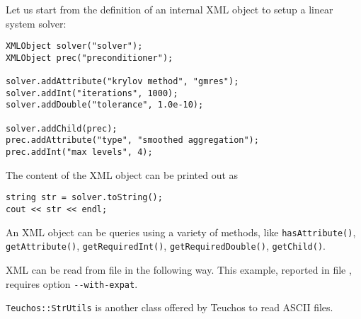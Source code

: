 Let us start from the definition of an internal XML object to setup a
linear system solver:
\begin{verbatim}
XMLObject solver("solver");
XMLObject prec("preconditioner");

solver.addAttribute("krylov method", "gmres");
solver.addInt("iterations", 1000);
solver.addDouble("tolerance", 1.0e-10);

solver.addChild(prec);
prec.addAttribute("type", "smoothed aggregation");
prec.addInt("max levels", 4);
\end{verbatim}
The content of the XML object can be printed out as
\begin{verbatim}
string str = solver.toString();
cout << str << endl;
\end{verbatim}
An XML object can be queries using a variety of methods, like
\verb!hasAttribute()!, \verb!getAttribute()!, \verb!getRequiredInt()!,
\verb!getRequiredDouble()!, \verb!getChild()!.

XML can be read from file in the following way. This example, reported
in file , requires option \verb!--with-expat!.

\begin{remark}
  \verb!Teuchos::StrUtils! is another class offered by Teuchos to read
  ASCII files.
\end{remark}
